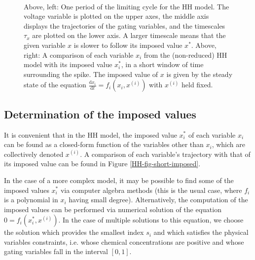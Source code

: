 \documentclass{llncs}
\newcommand{\D}[2]{ \ensuremath{ \frac{\mathrm{d} #1 }{\mathrm{d} #2 } }}
\begin{document}
	\begin{figure}[h!]
		\subfigure{
			\label{HH-fig-long-trajectory}
			
			\label{HH-fig-trajectory}
		}%
		~
		\subfigure{
    \def\thisfigxmin{\shortstart}
    \def\thisfigxmax{\shortend}
        
        \label{HH-fig-short-imposed}
		}%
		\caption{					Above, left:
					One period of the limiting cycle for the HH model.
					The voltage variable is plotted on the upper axes, the middle
					axis displays the trajectories of the gating variables, and
					the timescales $\tau_x$ are plotted on the lower axis. A
					larger timescale means that the given variable $x$ is slower
					to follow its imposed value $x^*$.
					Above, right: A comparison of each variable $x_i$ from the (non-reduced)
                 HH model with its imposed value $x_i^*$, in a
                 short window of time surrounding the spike. The imposed
                 value of $x$ is given by the steady
                 state of the equation
                 $\D{x_i}{t} = f_i(x_i,x^{(i)})$ with $x^{(i)}$
                 held fixed.
					}
	\end{figure}




\iffalse\FloatBarrier\fi
\subsection{Determination of the imposed values}

It is convenient that in the HH model, the imposed value $x_i^*$ of
each variable $x_i$ can be found as a closed-form function of the variables
other than $x_i$, which are collectively denoted $x^{(i)}$. A comparison of
each variable's trajectory with that of its imposed value can be found in
Figure \ref{HH-fig-short-imposed}.

In the case of a more complex model, it may be possible to find some of the
imposed values $x_i^*$ via computer algebra methods (this is the usual case,
where $f_i$ is a polynomial in $x_i$ having small degree).  {Alternatively, the
computation of the imposed values can be performed via numerical solution of the equation
$0=f_i(x_i^*,x^{(i)})$. In the case of multiple solutions to this equation, we choose the
solution which provides the smallest index $s_i$ and which satisfies the
physical variables constraints, i.e. whose chemical concentrations are positive
and whose gating variables fall in the interval $[0,1]$. }
\end{document}
